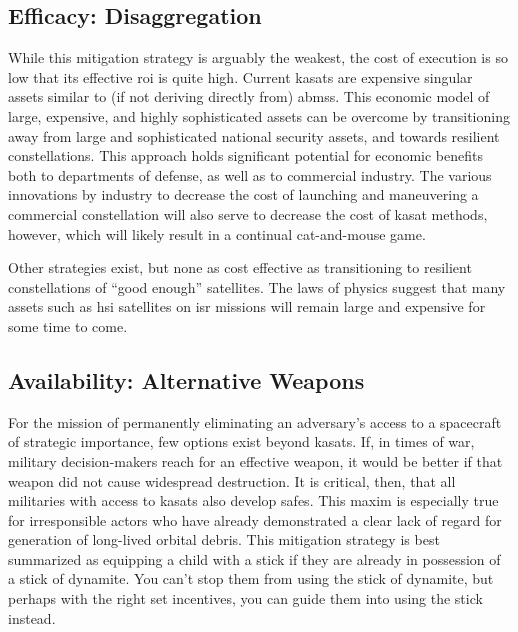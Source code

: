 \subsection*{Efficacy: Disaggregation}
While this mitigation strategy is arguably the weakest, the cost of
execution is so low that its effective \ac{roi} is quite high.
Current \acp{kasat} are expensive singular assets similar to (if not
deriving directly from) \acp{abms}.  This economic model of large,
expensive, and highly sophisticated assets can be overcome by
transitioning away from large and sophisticated national security
assets, and towards resilient constellations.  This approach holds
significant potential for economic benefits both to departments of
defense, as well as to commercial industry.\cite{big-risks} The
various innovations by industry to decrease the cost of launching and
maneuvering a commercial constellation will also serve to decrease the
cost of \ac{kasat} methods, however, which will likely result in a
continual cat-and-mouse game.

Other strategies exist, but none as cost effective as transitioning to
resilient constellations of ``good enough'' satellites.  The laws of
physics suggest that many assets such as \ac{hsi} satellites on
\ac{isr} missions will remain large and expensive for some time to
come.

\subsection*{Availability: Alternative Weapons}
For the mission of permanently eliminating an adversary's access to a
spacecraft of strategic importance, few options exist beyond
\acp{kasat}.  If, in times of war, military decision-makers reach for
an effective weapon, it would be better if that weapon did not cause
widespread destruction.  It is critical, then, that all militaries
with access to \acp{kasat} also develop \acp{safe}.  This maxim is
especially true for irresponsible actors who have already demonstrated
a clear lack of regard for generation of long-lived orbital debris.
This mitigation strategy is best summarized as equipping a child with
a stick if they are already in possession of a stick of dynamite.  You
can't stop them from using the stick of dynamite, but perhaps with the
right set incentives, you can guide them into using the stick instead.

